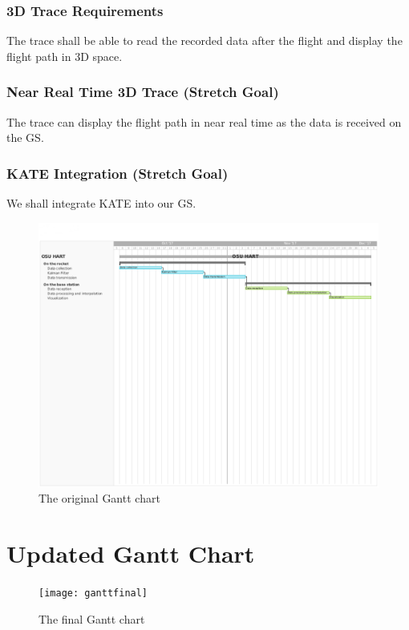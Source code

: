 \documentclass[onecolumn, draftclsnofoot,10pt, compsoc]{IEEEtran}
\begin{document}
\subsubsection{3D Trace Requirements}
The trace shall be able to read the recorded data after the flight
and display the flight path in 3D space.
\subsubsection{Near Real Time 3D Trace (Stretch Goal)}
The trace can display the flight path in near
real time as the data is received on the GS.
\subsubsection{KATE Integration (Stretch Goal)}
We shall integrate KATE into our GS.

\begin{figure}[h]
    \centering
        \includegraphics[width=16cm]{gantt}
        \caption{The original Gantt chart}
        \label{fig:gantt}
\end{figure}

\section{Updated Gantt Chart}
\begin{figure}[h]
    \centering
        \texttt{[image: ganttfinal]}
        \caption{The final Gantt chart}
        \label{fig:ganttfinal}
\end{figure}
\end{document}
